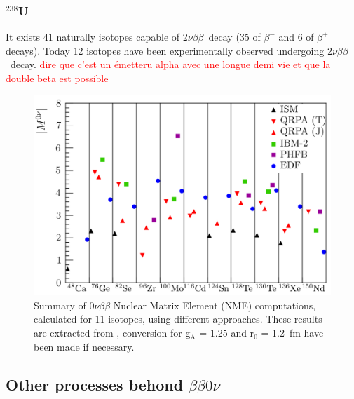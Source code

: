 \documentclass[main.tex]{subfiles}
\begin{document}
\subsubsection{$^{\text{238}}$U}
\NI 


\NI It exists 41 naturally isotopes capable of 2$\nu\beta\beta$~decay (35 of $\beta^{-}$ and 6 of $\beta^{+}$ decays). Today 12 isotopes have been experimentally observed undergoing 2$\nu\beta\beta$~decay. \textcolor{red}{dire que c'est un émetteru alpha avec une longue demi vie et que la double beta est possible}


\begin{figure}[h!]
\begin{center}
\includegraphics[scale=0.30]{pictures/Chap2/NMEdetailes.png}
\caption{Summary of 0$\nu\beta\beta$ Nuclear Matrix Element (NME) computations, calculated for 11 isotopes, using different approaches. These results are extracted from \cite{TheoryOfNeutrinolessDBD}, conversion for g$_{\text{A}}$ = 1.25 and r$_{\text{0}}$  = 1.2~fm have been made if necessary.}
\label{NME}
\end{center}
\end{figure}



\subsection{Other processes behond $\beta\beta0\nu$}

\NI
\end{document}
